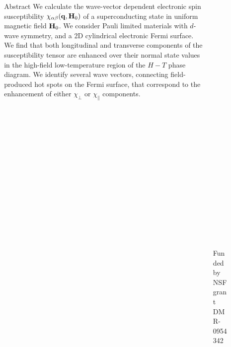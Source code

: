 \documentclass{beamer} %
\begin{document}
  
  
 
 


  \begin{frame}{} 
  	
	\begin{beamercolorbox}{}
	\maketitle
	\end{beamercolorbox}
	\vspace{-3cm}
	\begin{columns}[t]
		\begin{column}{0.1\textwidth}
			\begin{figure}
			\texttt{[image: ./figures/MSUlogo.jpg]}
			\end{figure}
		\end{column}
		\begin{column}{0.7\textwidth}
			\begin{block}{\centering\Huge Abstract}
	 {\large We calculate the wave-vector dependent electronic spin susceptibility 
	$\chi_{\alpha\beta}({\bf q}, {\bf H}_0)$ 
	of a superconducting state in uniform magnetic field ${\bf H}_0$. 
	We consider Pauli limited materials with $d$-wave symmetry, and a 2D cylindrical 
	electronic Fermi surface.  
	We find that both longitudinal and transverse components of the susceptibility tensor are enhanced over their
	normal state values in the high-field low-temperature region of the $H-T$
	phase diagram. We identify several wave vectors, connecting field-produced hot spots on the Fermi surface, 
	that correspond to the enhancement of either $\chi_\perp$ or $\chi_\parallel$ components. }	
		\end{block}
		\end{column}
		\begin{column}{0.1\textwidth}
			\begin{figure}
			\texttt{[image: ./figures/NSFlogo.jpg]}
			\end{figure}
			{\small Funded by NSF grant DMR-0954342}
		\end{column}
	\end{columns}


\end{frame}
\end{document}
